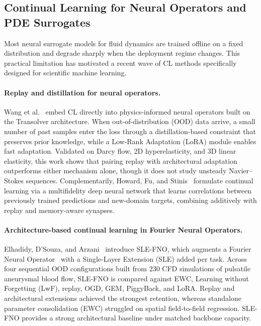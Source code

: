 \documentclass[11pt,a4paper]{article}
\begin{document}
\subsection{Continual Learning for Neural Operators and PDE Surrogates}

Most neural surrogate models for fluid dynamics are trained offline on a fixed distribution and degrade sharply when the deployment regime changes. This practical limitation has motivated a recent wave of CL methods specifically designed for scientific machine learning.

\paragraph{Replay and distillation for neural operators.} Wang et al.~\cite{wang2026replay} embed CL directly into physics-informed neural operators built on the Transolver architecture. When out-of-distribution (OOD) data arrive, a small number of past samples enter the loss through a distillation-based constraint that preserves prior knowledge, while a Low-Rank Adaptation (LoRA) module enables fast adaptation. Validated on Darcy flow, 2D hyperelasticity, and 3D linear elasticity, this work shows that pairing replay with architectural adaptation outperforms either mechanism alone, though it does not study unsteady Navier--Stokes sequences. Complementarily, Howard, Fu, and Stinis~\cite{howard2023multifidelity} formulate continual learning via a multifidelity deep neural network that learns correlations between previously trained predictions and new-domain targets, combining additively with replay and memory-aware synapses.

\paragraph{Architecture-based continual learning in Fourier Neural Operators.} Elhadidy, D'Souza, and Arzani~\cite{elhadidy2026slefno} introduce SLE-FNO, which augments a Fourier Neural Operator~\cite{li2021fno} with a Single-Layer Extension (SLE) added per task. Across four sequential OOD configurations built from 230 CFD simulations of pulsatile aneurysmal blood flow, SLE-FNO is compared against EWC, Learning without Forgetting (LwF), replay, OGD, GEM, PiggyBack, and LoRA. Replay and architectural extensions achieved the strongest retention, whereas standalone parameter consolidation (EWC) struggled on spatial field-to-field regression. SLE-FNO provides a strong architectural baseline under matched backbone capacity.
\end{document}
